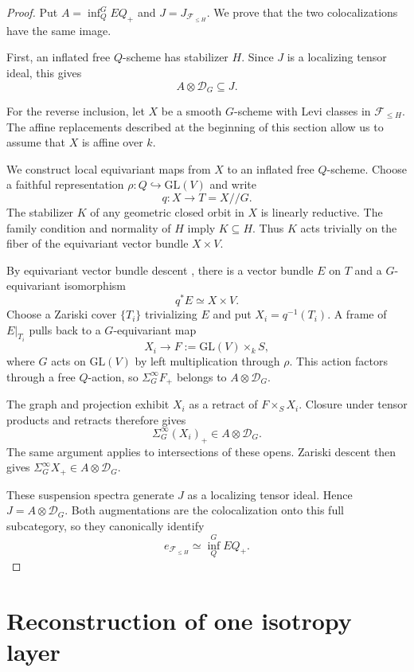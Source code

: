 \documentclass[11pt,reqno]{amsart}
\theoremstyle{definition}
\theoremstyle{remark}
\theoremstyle{plain}
\numberwithin{equation}{section}
\newcommand{\D}{\mathcal D}
\newcommand{\F}{\mathcal F}
\begin{document}
\begin{proof}
Put $A=\operatorname{inf}_Q^G EQ_+$ and
$J=J_{\F_{\leq H}}$.
We prove that the two colocalizations have the same image.

First, an inflated free $Q$-scheme has stabilizer $H$.
Since $J$ is a localizing tensor ideal, this gives
\[
  A\otimes\D_G\subseteq J.
\]

For the reverse inclusion, let $X$ be a smooth $G$-scheme
with Levi classes in $\F_{\leq H}$.
The affine replacements described at the beginning of this section
allow us to assume that $X$ is affine over $k$.

We construct local equivariant maps from $X$ to an inflated free
$Q$-scheme.
Choose a faithful representation
$\rho:Q\hookrightarrow\mathrm{GL}(V)$ and write
\[
  q:X\longrightarrow T=X/\!/G.
\]
The stabilizer $K$ of any geometric closed orbit in $X$ is
linearly reductive.
The family condition and normality of $H$ imply $K\subseteq H$.
Thus $K$ acts trivially on the fiber of the equivariant vector
bundle $X\times V$.

By equivariant vector bundle descent
\cite[Theorem~10.3]{AlperGMS}, there is a vector bundle $E$ on $T$
and a $G$-equivariant isomorphism
\[
  q^*E\simeq X\times V.
\]
Choose a Zariski cover $\{T_i\}$ trivializing $E$ and put
$X_i=q^{-1}(T_i)$.
A frame of $E|_{T_i}$ pulls back to a $G$-equivariant map
\[
  X_i\longrightarrow F:=\mathrm{GL}(V)\times_k S,
\]
where $G$ acts on $\mathrm{GL}(V)$ by left multiplication through
$\rho$.
This action factors through a free $Q$-action, so
$\Sigma^\infty_G F_+$ belongs to $A\otimes\D_G$.

The graph and projection exhibit $X_i$ as a retract of
$F\times_S X_i$.
Closure under tensor products and retracts therefore gives
\[
  \Sigma^\infty_G(X_i)_+\in A\otimes\D_G.
\]
The same argument applies to intersections of these opens.
Zariski descent then gives
$\Sigma^\infty_GX_+\in A\otimes\D_G$.

These suspension spectra generate $J$ as a localizing tensor ideal.
Hence $J=A\otimes\D_G$.
Both augmentations are the colocalization onto this full subcategory,
so they canonically identify
\[
  e_{\F_{\leq H}}\simeq\operatorname{inf}_Q^G EQ_+.
\]
\end{proof}

\section{Reconstruction of one isotropy layer}
\label{sec:one-layer}
\end{document}

